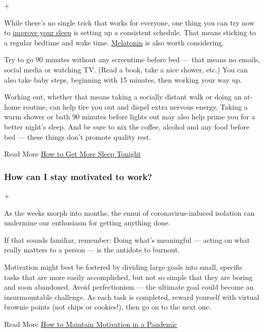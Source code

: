+

While there's no single trick that works for everyone, one thing you can
try now to
\href{https://www.nytimes.com/2020/03/25/style/self-care/sleep-tips-benefits-coronavirus.html}{improve
your sleep} is setting up a consistent schedule. That means sticking to
a regular bedtime and wake time.
\href{https://www.nytimes.com/2020/04/24/well/melatonin-sleep-aid-coronavirus.html}{Melatonin}
is also worth considering.

Try to go 90 minutes without any screentime before bed --- that means no
emails, social media or watching TV. (Read a book, take a nice shower,
etc.) You can also take baby steps, beginning with 15 minutes, then
working your way up.

Working out, whether that means taking a socially distant walk or doing
an at-home routine, can help tire you out and dispel extra nervous
energy. Taking a warm shower or bath 90 minutes before lights out may
also help prime you for a better night's sleep. And be sure to nix the
coffee, alcohol and any food before bed --- these things don't promote
quality rest.

 Read More
\href{https://www.nytimes.com/2020/03/25/style/self-care/sleep-tips-benefits-coronavirus.html}{How
to Get More Sleep Tonight}

\hypertarget{how-can-i-stay-motivated-to-work}{%
\subsubsection{How can I stay motivated to
work?}\label{how-can-i-stay-motivated-to-work}}

+

As the weeks morph into months, the ennui of coronavirus-induced
isolation can undermine our enthusiasm for getting anything done.

If that sounds familiar, remember: Doing what's meaningful --- acting on
what really matters to a person --- is the antidote to burnout.

Motivation might best be fostered by dividing large goals into small,
specific tasks that are more easily accomplished, but not so simple that
they are boring and soon abandoned. Avoid perfectionism --- the ultimate
goal could become an insurmountable challenge. As each task is
completed, reward yourself with virtual brownie points (not chips or
cookies!), then go on to the next one.

 Read More
\href{https://www.nytimes.com/2020/05/18/well/mind/motivation-pandemic-coronavirus.html}{How
to Maintain Motivation in a Pandemic}

